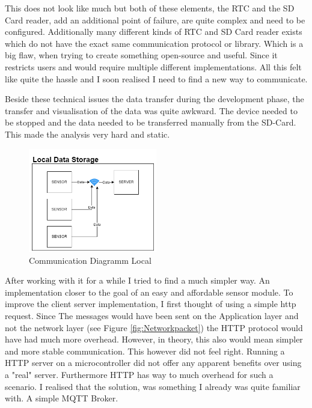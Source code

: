 This does not look like much but both of these elements, the RTC and the SD Card reader, add an additional point of failure, are quite complex and need to be configured. Additionally many different kinds of RTC and SD Card reader exists which do not have the exact same communication protocol or library. Which is a big flaw, when trying to create something open-source and useful. Since it restricts users and would require multiple different implementations. All this felt like quite the hassle and I soon realised I need to find a new way to communicate.

Beside these technical issues the data transfer during the development phase, the transfer and visualisation of the data was quite awkward. The device needed to be stopped and the data needed to be transferred manually from the SD-Card. This made the analysis very hard and static.

\begin{figure}[ht]
  \begin{center}
\includegraphics[width=0.5\textwidth]{images/CommunicationDiagrammLocal.png}
  \end{center}
  \caption{Communication Diagramm Local}
  \label{fig:CommunicationDiagrammLocal}
\end{figure}

After working with it for a while I tried to find a much simpler way. An implementation closer to the goal of an easy and affordable sensor module. To improve the client server implementation, I first thought of using a simple http request. Since The messages would have been sent on the Application layer and not the network layer (see Figure \ref{fig:Networkpacket}) the HTTP protocol would have had much more overhead. However, in theory, this also would mean simpler and more stable communication. This however did not feel right. Running a HTTP server on a microcontroller did not offer any apparent benefits over using a "real" server. Furthermore HTTP has way to much overhead for such a scenario. I realised that the solution, was something I already was quite familiar with. A simple MQTT Broker. 


